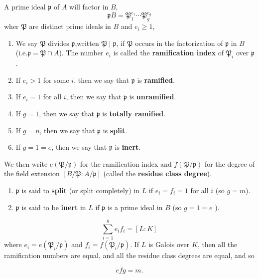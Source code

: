 \documentclass[12pt, oneside]{book}
\begin{document}
\begin{definition}
    A prime ideal $\mathfrak{p}$ of $A$ will factor in $B$,
    \begin{equation*}
        \mathfrak{p}B
        =
        \mathfrak{P}_1^{e_1} \cdots \mathfrak{P}_g^{e_g}
    \end{equation*}
    wher $\mathfrak{P}$ are distinct prime ideals in $B$ and $e_i\geq 1$,
    \begin{enumerate}
        \item
              We say $\mathfrak{P}$ divides $\mathfrak{p}$,written $\mathfrak{P} \mid \mathfrak{p}$, if $\mathfrak{P}$ occurs in the factorization of $\mathfrak{p}$ in $B$ (i.e.$\mathfrak{p}=\mathfrak{P}\cap A$).
              The number $e_i$ is called the \textbf{ramification index} of $\mathfrak{P}_i$ over $\mathfrak{p}$.
        \item
              If $e_i >1$ for some $i$, then we say that $\mathfrak{p}$ is \textbf{ramified}.
        \item
              If $e_i=1$ for all $i$, then we say that $\mathfrak{p}$ is \textbf{unramified}.
        \item If $g=1$, then we say that $\mathfrak{p}$ is \textbf{totally ramified}.
        \item If $g=n$, then we say that $\mathfrak{p}$ is \textbf{split}.
        \item If $g=1=e$, then we say that $\mathfrak{p}$ is \textbf{inert}.

    \end{enumerate}
    We then write $e(\mathfrak{P} / \mathfrak{p})$ for the ramification index and $f(\mathfrak{P} / \mathfrak{p})$ for the degree of the field extension $[B / \mathfrak{P}: A / \mathfrak{p}]$ (called the \textbf{residue class degree}).
    \begin{enumerate}[resume]
        \item
              $\mathfrak{p}$ is said to \textbf{split} (or split completely) in $L$ if $e_i=f_i=1$ for all $i$ (so $g=m$).

        \item
              $\mathfrak{p}$ is said to be \textbf{inert} in $L$ if $\mathfrak{p}$ is a prime ideal in $B$ (so $g=1=e$ ).
    \end{enumerate}
\end{definition}


\begin{theorem}
    \begin{equation*}
        \sum_{i=1}^g e_i f_i= [L: K]
    \end{equation*}
    where $e_i=e\left(\mathfrak{P}_i / \mathfrak{p}\right)$ and $f_i=f\left(\mathfrak{P}_i / \mathfrak{p}\right)$. If $L$ is Galois over $K$, then all the ramification numbers are equal, and all the residue class degrees are equal, and so

    \begin{equation*}
        e f g=m .
    \end{equation*}
\end{theorem}
\end{document}
